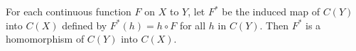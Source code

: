 For each continuous function $F$ on $X$ to $Y$, let $F^*$ be the induced map of $C(Y)$ into $C(X)$ defined by $F^*(h) = h \circ F$ for all $h$ in $C(Y)$. Then $F^*$ is a homomorphism of $C(Y)$ into $C(X)$.
